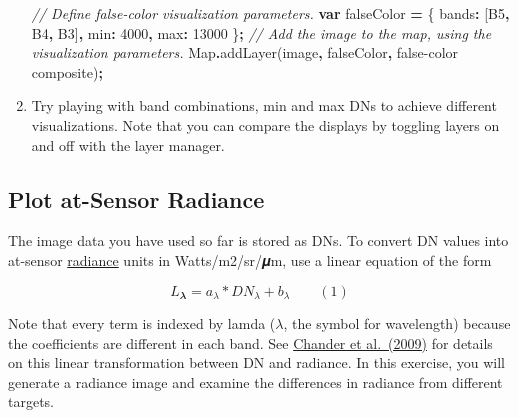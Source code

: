 \documentclass[
]{article}
\newenvironment{Shaded}{\begin{snugshade}}{\end{snugshade}}
\newcommand{\BuiltInTok}[1]{#1}
\newcommand{\CommentTok}[1]{\textcolor[rgb]{0.56,0.35,0.01}{\textit{#1}}}
\newcommand{\DataTypeTok}[1]{\textcolor[rgb]{0.13,0.29,0.53}{#1}}
\newcommand{\DecValTok}[1]{\textcolor[rgb]{0.00,0.00,0.81}{#1}}
\newcommand{\FunctionTok}[1]{\textcolor[rgb]{0.00,0.00,0.00}{#1}}
\newcommand{\KeywordTok}[1]{\textcolor[rgb]{0.13,0.29,0.53}{\textbf{#1}}}
\newcommand{\NormalTok}[1]{#1}
\newcommand{\OperatorTok}[1]{\textcolor[rgb]{0.81,0.36,0.00}{\textbf{#1}}}
\newcommand{\StringTok}[1]{\textcolor[rgb]{0.31,0.60,0.02}{#1}}
\begin{document}
\begin{enumerate}
\begin{Shaded}
\begin{Highlighting}[]
\CommentTok{//  Define false{-}color visualization parameters.   }
\KeywordTok{var}\NormalTok{ falseColor }\OperatorTok{=}\NormalTok{ \{    }\DataTypeTok{bands}\OperatorTok{:}\NormalTok{ [}\StringTok{\textquotesingle{}B5\textquotesingle{}}\OperatorTok{,} \StringTok{\textquotesingle{}B4\textquotesingle{}}\OperatorTok{,} \StringTok{\textquotesingle{}B3\textquotesingle{}}\NormalTok{]}\OperatorTok{,}    \DataTypeTok{min}\OperatorTok{:} \DecValTok{4000}\OperatorTok{,}    \DataTypeTok{max}\OperatorTok{:} \DecValTok{13000}\NormalTok{   \}}\OperatorTok{;}  
\CommentTok{// Add the image to the  map, using the visualization parameters.   }
\BuiltInTok{Map}\OperatorTok{.}\FunctionTok{addLayer}\NormalTok{(image}\OperatorTok{,}\NormalTok{ falseColor}\OperatorTok{,} \StringTok{\textquotesingle{}false{-}color composite\textquotesingle{}}\NormalTok{)}\OperatorTok{;} 
\end{Highlighting}
\end{Shaded}
\item
  Try playing with band combinations, min and max DNs to achieve different visualizations. Note that you can compare the displays by toggling layers on and off with the layer manager.
\end{enumerate}

\hypertarget{plot-at-sensor-radiance}{%
\subsection{Plot at-Sensor Radiance}\label{plot-at-sensor-radiance}}

The image data you have used so far is stored as DNs. To convert DN values into at-sensor \href{https://en.wikipedia.org/wiki/Radiance}{radiance} units in Watts/m2/sr/𝝁m, use a linear equation of the form

\[ L_𝝀 = a_{\lambda} * DN_{\lambda} + b_{\lambda}  \qquad (1) \]

Note that every term is indexed by lamda (\(\lambda\), the symbol for wavelength) because the coefficients are different in each band. See \href{http://www.sciencedirect.com/science/article/pii/S0034425709000169}{Chander et al.~(2009)} for details on this linear transformation between DN and radiance. In this exercise, you will generate a radiance image and examine the differences in radiance from different targets.
\end{document}
